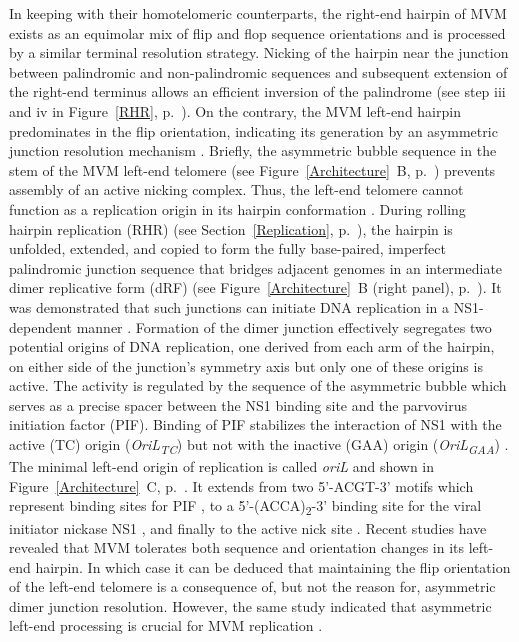 In keeping with their homotelomeric counterparts, the right-end hairpin of MVM exists as an equimolar mix of flip and flop sequence orientations and is processed by a similar terminal resolution strategy. Nicking of the hairpin near the junction between palindromic and non-palindromic sequences and subsequent extension of the right-end terminus allows an efficient inversion of the palindrome (see step iii and iv in Figure~\ref{RHR}, p.~\pageref{RHR}). On the contrary, the MVM left-end hairpin predominates in the flip orientation, indicating its generation by an asymmetric junction resolution mechanism \cite{pmid12743281}. Briefly, the asymmetric bubble sequence in the stem of the MVM left-end telomere (see Figure~\ref{Architecture}~B, p.~\pageref{Architecture}) prevents assembly of an active nicking complex. Thus, the left-end telomere cannot function as a replication origin in its hairpin conformation \cite{pmid8995615}. During rolling hairpin replication (RHR) (see Section~\ref{Replication}, p.~\pageref{Replication}), the hairpin is unfolded, extended, and copied to form the fully base-paired, imperfect palindromic junction sequence that bridges adjacent genomes in an intermediate dimer replicative form (dRF) (see Figure~\ref{Architecture}~B (right panel), p.~\pageref{Architecture}). It was demonstrated that such junctions can initiate DNA replication in a NS1-dependent manner \cite{pmid8076610, pmid1530771}. Formation of the dimer junction effectively segregates two potential origins of DNA replication, one derived from each arm of the hairpin, on either side of the junction's symmetry axis but only one of these origins is active. The activity is regulated by the sequence of the asymmetric bubble which serves as a precise spacer between the NS1 binding site and the parvovirus initiation factor (PIF). Binding of PIF stabilizes the interaction of NS1 with the active (TC) origin (\textit{OriL\textsubscript{TC}}) but not with the inactive (GAA) origin (\textit{OriL\textsubscript{GAA}}) \cite{pmid11435581}. The minimal left-end origin of replication is called \textit{oriL} and shown in Figure~\ref{Architecture}~C, p.~\pageref{Architecture}. It extends from two 5'-ACGT-3' motifs which represent binding sites for PIF \cite{pmid8995666, pmid9223459, pmid10523663}, to a 5'-(ACCA)\textsubscript{2}-3' binding site for the viral initiator nickase NS1 \cite{pmid7853501}, and finally to the active nick site \cite{pmid8076610}. Recent studies have revealed that MVM tolerates both sequence and orientation changes in its left-end hairpin. In which case it can be deduced that maintaining the flip orientation of the left-end telomere is a consequence of, but not the reason for, asymmetric dimer junction resolution. However, the same study indicated that asymmetric left-end processing is crucial for MVM replication \cite{pmid22933276}.  

